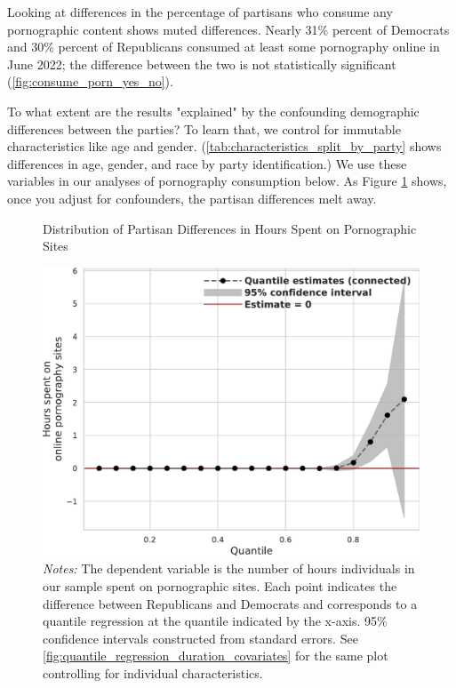 \documentclass[12pt, letterpaper]{article}
\begin{document}
Looking at differences in the percentage of partisans who consume any pornographic content shows muted differences. Nearly 31\% percent of Democrats and 30\% percent of Republicans consumed at least some pornography online in June 2022; the difference between the two is not statistically significant (\cref{fig:consume_porn_yes_no}). 

To what extent are the results "explained" by the confounding demographic differences between the parties? To learn that, we control for immutable characteristics like age and gender. (\cref{tab:characteristics_split_by_party} shows differences in age, gender, and race by party identification.) We use these variables in our analyses of pornography consumption below. As Figure \ref{fig:quantile_regression_duration} shows, once you adjust for confounders, the partisan differences melt away.

\begin{figure}[t]
	\centering
	\caption{Distribution of Partisan Differences in Hours Spent on Pornographic Sites}
	\includegraphics[width=.7\linewidth]{figs/quantile_reg_duration_adult.pdf}
	\caption*{\footnotesize \emph{Notes:} 
		The dependent variable is the number of hours individuals in our sample spent on pornographic sites.
		Each point indicates the difference between Republicans and Democrats and corresponds to a quantile regression at the quantile indicated by the x-axis.
		95\% confidence intervals constructed from standard errors.
		See \cref{fig:quantile_regression_duration_covariates} for the same plot controlling for individual characteristics.
	}
	\label{fig:quantile_regression_duration}
\end{figure}
\end{document}
